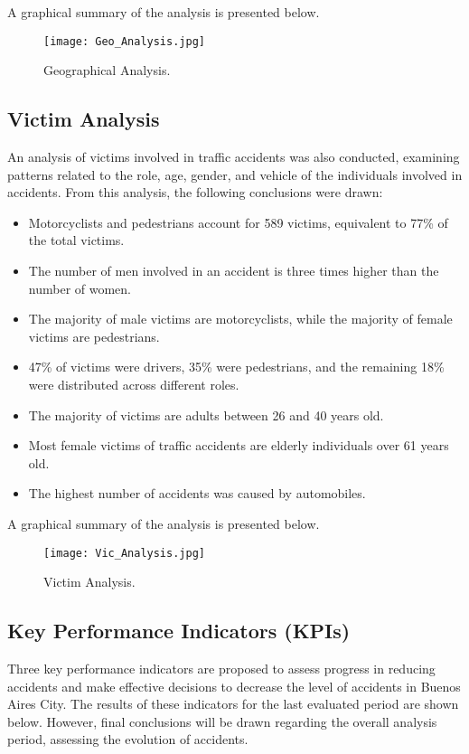 \documentclass[12pt]{article}
\begin{document}
A graphical summary of the analysis is presented below.

\begin{figure}[H]
  \centering
  \texttt{[image: Geo\_Analysis.jpg]}
  \caption{Geographical Analysis.}
  \label{fig:geo-analysis}
\end{figure}

\subsection{Victim Analysis}
An analysis of victims involved in traffic accidents was also conducted, examining patterns related to the role, age, gender, and vehicle of the individuals involved in accidents. From this analysis, the following conclusions were drawn:
\begin{itemize}
    \item Motorcyclists and pedestrians account for 589 victims, equivalent to 77\% of the total victims.
    
    \item The number of men involved in an accident is three times higher than the number of women.
    
    \item The majority of male victims are motorcyclists, while the majority of female victims are pedestrians.
    
    \item 47\% of victims were drivers, 35\% were pedestrians, and the remaining 18\% were distributed across different roles.
    
    \item The majority of victims are adults between 26 and 40 years old.
    
    \item Most female victims of traffic accidents are elderly individuals over 61 years old.
    
    \item The highest number of accidents was caused by automobiles.
\end{itemize}

A graphical summary of the analysis is presented below.

\begin{figure}[H]
  \centering
  \texttt{[image: Vic\_Analysis.jpg]}
  \caption{Victim Analysis.}
  \label{fig:vic-analysis}
\end{figure}

\subsection{Key Performance Indicators (KPIs)}
Three key performance indicators are proposed to assess progress in reducing accidents and make effective decisions to decrease the level of accidents in Buenos Aires City. The results of these indicators for the last evaluated period are shown below. However, final conclusions will be drawn regarding the overall analysis period, assessing the evolution of accidents.
\end{document}
